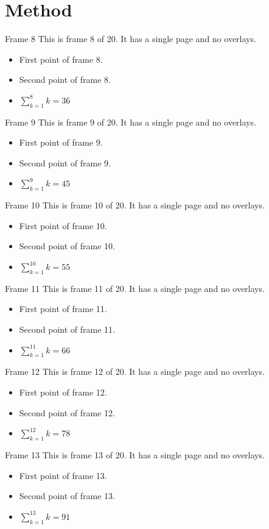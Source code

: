 \documentclass[aspectratio=169]{beamer}
\begin{document}
\section{Method}
\begin{frame}{Frame 8}
  This is frame 8 of 20. It has a single page and no overlays.
  \begin{itemize}
    \item First point of frame 8.
    \item Second point of frame 8.
    \item $\sum_{k=1}^{8} k = 36$
  \end{itemize}
\end{frame}
\begin{frame}{Frame 9}
  This is frame 9 of 20. It has a single page and no overlays.
  \begin{itemize}
    \item First point of frame 9.
    \item Second point of frame 9.
    \item $\sum_{k=1}^{9} k = 45$
  \end{itemize}
\end{frame}
\begin{frame}{Frame 10}
  This is frame 10 of 20. It has a single page and no overlays.
  \begin{itemize}
    \item First point of frame 10.
    \item Second point of frame 10.
    \item $\sum_{k=1}^{10} k = 55$
  \end{itemize}
\end{frame}
\begin{frame}{Frame 11}
  This is frame 11 of 20. It has a single page and no overlays.
  \begin{itemize}
    \item First point of frame 11.
    \item Second point of frame 11.
    \item $\sum_{k=1}^{11} k = 66$
  \end{itemize}
\end{frame}
\begin{frame}{Frame 12}
  This is frame 12 of 20. It has a single page and no overlays.
  \begin{itemize}
    \item First point of frame 12.
    \item Second point of frame 12.
    \item $\sum_{k=1}^{12} k = 78$
  \end{itemize}
\end{frame}
\begin{frame}{Frame 13}
  This is frame 13 of 20. It has a single page and no overlays.
  \begin{itemize}
    \item First point of frame 13.
    \item Second point of frame 13.
    \item $\sum_{k=1}^{13} k = 91$
  \end{itemize}
\end{frame}
\end{document}
